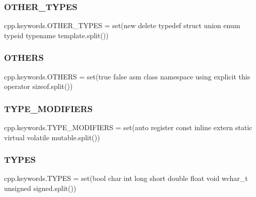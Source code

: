 \subsubsection{\texorpdfstring{O\+T\+H\+E\+R\+\_\+\+T\+Y\+P\+ES}{OTHER\_TYPES}}
{\footnotesize\ttfamily cpp.\+keywords.\+O\+T\+H\+E\+R\+\_\+\+T\+Y\+P\+ES = set(\textquotesingle{}new delete typedef struct union enum typeid typename template\textquotesingle{}.split())}

\mbox{\label{namespacecpp_1_1keywords_a15fe231fbad145538b73892804898809}} 
\subsubsection{\texorpdfstring{O\+T\+H\+E\+RS}{OTHERS}}
{\footnotesize\ttfamily cpp.\+keywords.\+O\+T\+H\+E\+RS = set(\textquotesingle{}true false asm class namespace using explicit this operator sizeof\textquotesingle{}.split())}

\mbox{\label{namespacecpp_1_1keywords_af9282ce418d6b4b43dca5ed574caedd7}} 
\subsubsection{\texorpdfstring{T\+Y\+P\+E\+\_\+\+M\+O\+D\+I\+F\+I\+E\+RS}{TYPE\_MODIFIERS}}
{\footnotesize\ttfamily cpp.\+keywords.\+T\+Y\+P\+E\+\_\+\+M\+O\+D\+I\+F\+I\+E\+RS = set(\textquotesingle{}auto register const inline extern static virtual volatile mutable\textquotesingle{}.split())}

\mbox{\label{namespacecpp_1_1keywords_a56fd5baf357970548e1ec366edfc2c13}} 
\subsubsection{\texorpdfstring{T\+Y\+P\+ES}{TYPES}}
{\footnotesize\ttfamily cpp.\+keywords.\+T\+Y\+P\+ES = set(\textquotesingle{}bool char int long short double float void wchar\+\_\+t unsigned signed\textquotesingle{}.split())}

